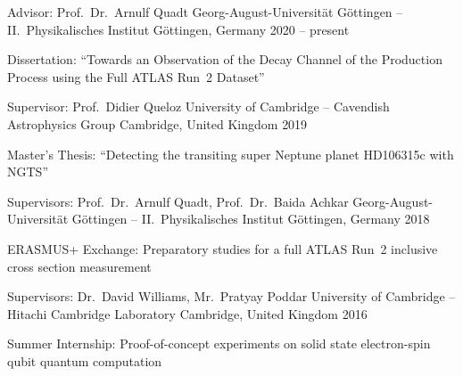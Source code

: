 

\begin{cventries}

  \cventry
    {Advisor: Prof.\ Dr.\ Arnulf Quadt} %
    {Georg-August-Universit\"at G\"ottingen -- II.\ Physikalisches Institut} %
    {G\"ottingen, Germany} %
    {2020 -- present} %
    {%
      \begin{cvitems} %
        \item {%
          Dissertation: ``Towards an Observation of the \Hbb Decay Channel of the \ttH Production Process\newline
          using the Full ATLAS Run~2 Dataset''
        }
      \end{cvitems}
    }

  \cventry
    {Supervisor: Prof.\ Didier Queloz} %
    {University of Cambridge -- Cavendish Astrophysics Group} %
    {Cambridge, United Kingdom} %
    {2019} %
    {%
      \begin{cvitems} %
        \item {Master's Thesis: ``Detecting the transiting super Neptune planet HD106315c with NGTS''}
      \end{cvitems}
    }

  \cventry
    {Supervisors: Prof.\ Dr.\ Arnulf Quadt, Prof.\ Dr.\ Baida Achkar} %
    {Georg-August-Universit\"at G\"ottingen -- II.\ Physikalisches Institut} %
    {G\"ottingen, Germany} %
    {2018} %
    {%
      \begin{cvitems} %
        \item {ERASMUS+ Exchange: Preparatory studies for a full ATLAS Run~2 \ttbar inclusive cross section measurement}
      \end{cvitems}
    }

  \cventry
    {Supervisors: Dr.\ David Williams, Mr.\ Pratyay Poddar} %
    {University of Cambridge -- Hitachi Cambridge Laboratory} %
    {Cambridge, United Kingdom} %
    {2016} %
    {%
      \begin{cvitems} %
        \item {Summer Internship: Proof-of-concept experiments on solid state electron-spin qubit quantum computation}
      \end{cvitems}
    }

\end{cventries}
